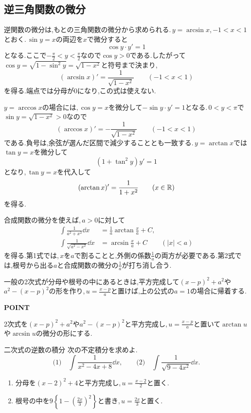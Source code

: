 \subsection{逆三角関数の微分}

逆関数の微分は,もとの三角関数の微分から求められる.\,$y=\arcsin x$,\,$-1<x<1$とおく.\,$\sin y=x$の両辺を$x$で微分すると
\[
\cos y\cdot y'=1
\]
となる.ここで$-\frac\pi2<y<\frac\pi2$なので$\cos y>0$である.したがって$\cos y=\sqrt{1-\sin^2y}=\sqrt{1-x^2}$と符号まで決まり,
\[
(\arcsin x)'=\frac1{\sqrt{1-x^2}}\qquad(-1<x<1)
\]
を得る.端点では分母が$0$になり,この式は使えない.

$y=\arccos x$の場合には,\,$\cos y=x$を微分して$-\sin y\cdot y'=1$となる.\,$0<y<\pi$で$\sin y=\sqrt{1-x^2}>0$なので
\[
(\arccos x)'=-\frac1{\sqrt{1-x^2}}\qquad(-1<x<1)
\]
である.負号は,余弦が選んだ区間で減少することとも一致する.\,$y=\arctan x$では$\tan y=x$を微分して
\[
(1+\tan^2y)y'=1
\]
となり,\,$\tan y=x$を代入して
\[
(\arctan x)'=\frac1{1+x^2}\qquad(x\in\mathbb{R})
\]
を得る.

合成関数の微分を使えば,\,$a>0$に対して
\begin{equation}\label{式:逆三角関数の積分}
\begin{aligned}
\int\frac1{a^2+x^2}\dd x
 &=\frac1a\arctan\frac xa+C,\\
\int\frac1{\sqrt{a^2-x^2}}\dd x
 &=\arcsin\frac xa+C\qquad(|x|<a)
\end{aligned}
\end{equation}
を得る.第1式では,\,$x$を$a$で割ることと,外側の係数$\frac1a$の両方が必要である.第2式では,根号から出る$a$と合成関数の微分の$\frac1a$が打ち消し合う.

一般の2次式が分母や根号の中にあるときは,平方完成して$(x-p)^2+a^2$や$a^2-(x-p)^2$の形を作り,\,$u=\frac{x-p}{a}$と置けば,上の公式の$a=1$の場合に帰着する.

\begin{bookpoint}
\textbf{POINT}\par
2次式を$(x-p)^2+a^2$や$a^2-(x-p)^2$と平方完成し,\,$u=\frac{x-p}{a}$と置いて$\arctan u$や$\arcsin u$の微分の形にする.
\end{bookpoint}

\begin{example}{二次式の逆数の積分}
次の不定積分を求めよ.
\[
\text{(1)}\quad\int\frac1{x^2-4x+8}\dd x,
\qquad
\text{(2)}\quad\int\frac1{\sqrt{9-4x^2}}\dd x.
\]
\end{example}

\begin{enumerate}[label=(\arabic*)]
\item 分母を$(x-2)^2+4$と平方完成し,\,$u=\frac{x-2}{2}$と置く.
\item 根号の中を$9\left\{1-\left(\frac{2x}{3}\right)^2\right\}$と書き,\,$u=\frac{2x}{3}$と置く.
\end{enumerate}

